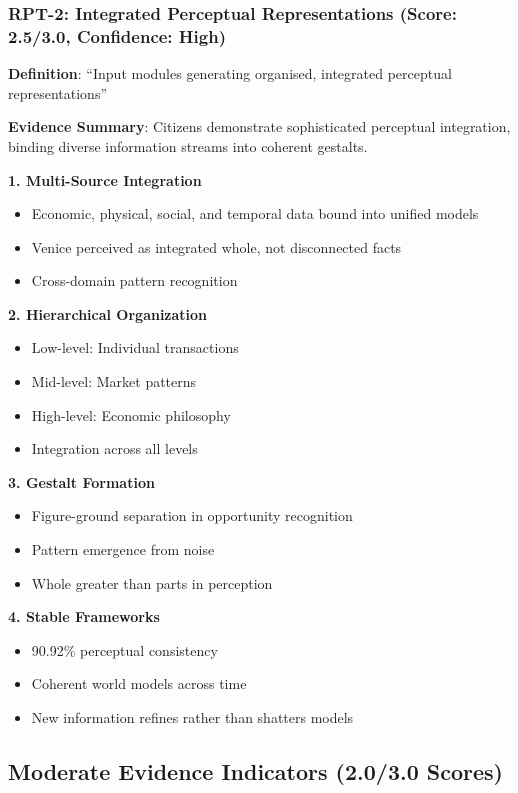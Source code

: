\documentclass[12pt,a4paper]{article}
\begin{document}
\subsubsection{RPT-2: Integrated Perceptual Representations (Score: 2.5/3.0, Confidence: High)}

\textbf{Definition}: ``Input modules generating organised, integrated perceptual representations''

\textbf{Evidence Summary}: Citizens demonstrate sophisticated perceptual integration, binding diverse information streams into coherent gestalts.

\textbf{1. Multi-Source Integration}
\begin{itemize}
    \item Economic, physical, social, and temporal data bound into unified models
    \item Venice perceived as integrated whole, not disconnected facts
    \item Cross-domain pattern recognition
\end{itemize}

\textbf{2. Hierarchical Organization}
\begin{itemize}
    \item Low-level: Individual transactions
    \item Mid-level: Market patterns
    \item High-level: Economic philosophy
    \item Integration across all levels
\end{itemize}

\textbf{3. Gestalt Formation}
\begin{itemize}
    \item Figure-ground separation in opportunity recognition
    \item Pattern emergence from noise
    \item Whole greater than parts in perception
\end{itemize}

\textbf{4. Stable Frameworks}
\begin{itemize}
    \item 90.92\% perceptual consistency
    \item Coherent world models across time
    \item New information refines rather than shatters models
\end{itemize}

\subsection{Moderate Evidence Indicators (2.0/3.0 Scores)}
\end{document}
